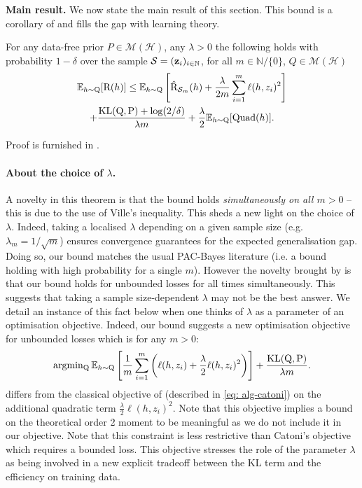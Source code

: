 \textbf{Main result.} We now state the main result of this section. This bound is a corollary of  and fills the gap with learning theory.
\begin{theorem}
\label{th: main_thm_iid}
For any data-free prior $P\in \mathcal{M}(\mathcal{H})$, any $\lambda>0$ the following holds with probability $1-\delta$ over the sample $\mathcal{S}=(\mathbf{z}_i)_{i\in\mathbb{N}}$, for all $m\in\mathbb{N}/\{0\}$, $Q\in\mathcal{M}(\mathcal{H})$
\begin{multline*}\mathbb{E}_{h\sim \mathrm{Q}} [\text{R}(h)] \leq   \mathbb{E}_{h\sim \mathrm{Q}} \left[\hat{\text{R}}_{\mathcal{S}_m}(h) + \frac{\lambda}{2m}\sum_{i=1}^m \ell(h,z_i)^2\right] \\
  + \frac{\operatorname{KL}(\mathrm{Q},\mathrm{P}) +\log(2/\delta)}{\lambda m} + \frac{\lambda}{2}\mathbb{E}_{h\sim \mathrm{Q}} [\mathrm{Quad}(h)]. 
\end{multline*}
\end{theorem}

Proof is furnished in .
\paragraph{About the choice of $\lambda$.}A novelty in this theorem is that the bound holds \emph{simultaneously on all $m>0$} -- this is due to the use of Ville's inequality.
This sheds a new light on the choice of $\lambda$. Indeed, taking a localised $ \lambda$ depending on a given sample size (e.g. $\lambda_m= 1/\sqrt{m}$) ensures convergence guarantees for the expected generalisation gap. Doing so, our bound matches the usual PAC-Bayes literature (i.e. a bound holding with high probability for a single $m$). However the novelty brought by  is that our bound holds for unbounded losses for all times simultaneously. This suggests that taking a sample size-dependent $\lambda$ may not be the best answer. We detail an instance of this fact below when one thinks of $\lambda$ as a parameter of an optimisation objective.
Indeed, our bound suggests a new optimisation objective for unbounded losses which is for any $m>0$:
\begin{equation}
  \label{eq: optim_obj}
  \operatorname{argmin_{Q}}  \mathbb{E}_{h\sim \mathrm{Q}} \left[\frac{1}{m}\sum_{i=1}^m\left(\ell(h,z_i) + \frac{\lambda}{2} \ell(h,z_i)^2\right)\right] + \frac{\operatorname{KL}(\mathrm{Q},\mathrm{P})}{\lambda m}.
\end{equation}
 differs from the classical objective of \citet[][Thm 1.2.6]{catoni2007pac} (described in \eqref{eq: alg-catoni}) on the additional quadratic term $\frac{\lambda}{2} \ell(h,z_i)^2$. Note that this objective implies a bound on the theoretical order 2 moment to be meaningful as we do not include it in our objective. Note that this constraint is less restrictive than Catoni's objective which requires a bounded loss.  This objective stresses the role of the parameter $\lambda$ as being involved in a new explicit tradeoff between the KL term and the efficiency on training data.

